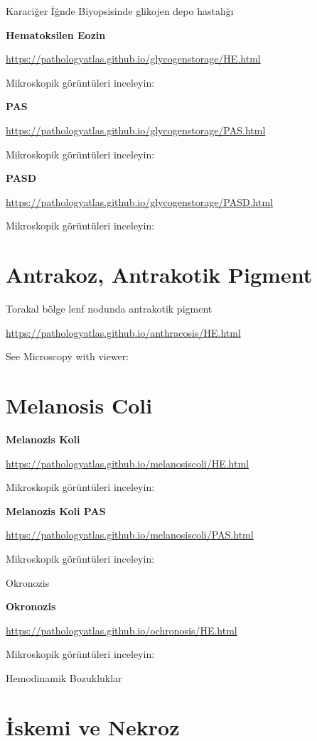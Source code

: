 \documentclass[
  letterpaper,
  DIV=11,
  numbers=noendperiod]{scrreprt}
\begin{document}
Karaciğer İğnde Biyopsisinde glikojen depo hastalığı

\textbf{Hematoksilen Eozin}

\url{https://pathologyatlas.github.io/glycogenstorage/HE.html}

Mikroskopik görüntüleri inceleyin:

\textbf{PAS}

\url{https://pathologyatlas.github.io/glycogenstorage/PAS.html}

Mikroskopik görüntüleri inceleyin:

\textbf{PASD}

\url{https://pathologyatlas.github.io/glycogenstorage/PASD.html}

Mikroskopik görüntüleri inceleyin:

\hypertarget{antrakoz-antrakotik-pigment}{%
\chapter{Antrakoz, Antrakotik
Pigment}\label{antrakoz-antrakotik-pigment}}

Torakal bölge lenf nodunda antrakotik pigment

\url{https://pathologyatlas.github.io/anthracosis/HE.html}

See Microscopy with viewer:

\hypertarget{melanosis-coli}{%
\chapter{Melanosis Coli}\label{melanosis-coli}}

\textbf{Melanozis Koli}

\url{https://pathologyatlas.github.io/melanosiscoli/HE.html}

Mikroskopik görüntüleri inceleyin:

\textbf{Melanozis Koli PAS}

\url{https://pathologyatlas.github.io/melanosiscoli/PAS.html}

Mikroskopik görüntüleri inceleyin:

Okronozis

\textbf{Okronozis}

\url{https://pathologyatlas.github.io/ochronosis/HE.html}

Mikroskopik görüntüleri inceleyin:

Hemodinamik Bozukluklar

\hypertarget{iskemi-ve-nekroz}{%
\chapter{İskemi ve Nekroz}\label{iskemi-ve-nekroz}}
\end{document}
